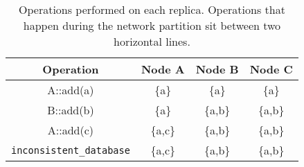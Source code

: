 \begin{table}[htp]
  \begin{tabular}{cccc}
    \toprule
    Operation & Node A & Node B & Node C \\
    \midrule
    A::add(a) & \{a\} & \{a\} & \{a\} \\
    \cmidrule{2-4}
    B::add(b) & \{a\} & \{a,b\} & \{a,b\} \\
    A::add(c) & \{a,c\} & \{a,b\} & \{a,b\} \\
    \cmidrule{2-4}
    \texttt{inconsistent\_database} & \{a,c\} & \{a,b\} & \{a,b\} \\
    \bottomrule
  \end{tabular} 
  \caption{Operations performed on each replica. Operations that happen during
  the network partition sit between two horizontal lines.}
  \label{tab:mnesia comm failure ops}
\end{table}

  
  

